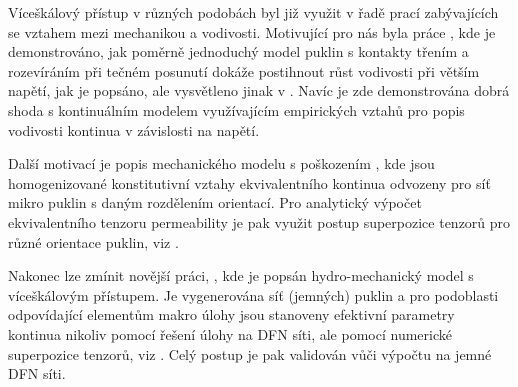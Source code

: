 \documentclass{article}
\begin{document}
Víceškálový přístup v různých podobách byl již využit v řadě prací zabývajících se vztahem mezi mechanikou a vodivosti. 
Motivující pro nás byla práce \cite{Min2004a}, kde je demonstrováno, jak poměrně jednoduchý model puklin s 
kontakty třením a rozevíráním při tečném posunutí
dokáže postihnout růst vodivosti při větším napětí, jak je popsáno, ale vysvětleno jinak v \cite{Souley2001}.
Navíc je zde demonstrována dobrá shoda s kontinuálním modelem využívajícím empirických vztahů pro popis vodivosti kontinua v závislosti na napětí.

Další motivací je popis mechanického modelu s poškozením \cite{Shao2005}, kde jsou homogenizované konstitutivní vztahy ekvivalentního kontinua
odvozeny pro síť mikro puklin s daným rozdělením orientací. Pro analytický výpočet ekvivalentního tenzoru permeability je pak využit postup superpozice tenzorů 
pro různé orientace puklin, viz \cite{Oda1986a}.

Nakonec lze zmínit novější práci, \cite{Rutqvist2013}, kde je popsán hydro-mechanický model s víceškálovým přístupem. Je vygenerována síť (jemných) 
puklin a pro podoblasti odpovídající elementům makro úlohy jsou stanoveny efektivní parametry kontinua nikoliv pomocí řešení  úlohy na DFN síti, 
ale pomocí numerické superpozice tenzorů, viz \cite{Oda1986a}. Celý postup je pak validován vůči výpočtu na jemné DFN síti.



% 
% 
\end{document}
